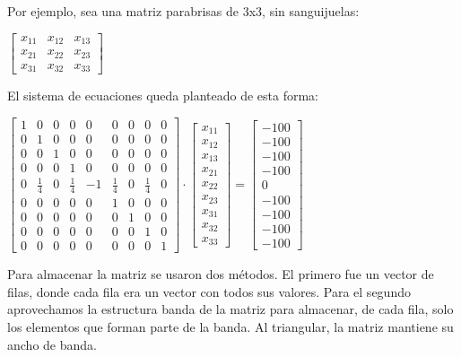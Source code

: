 \documentclass[spanish,a4paper]{article}
\begin{document}
Por ejemplo, sea una matriz parabrisas de 3x3, sin sanguijuelas: \newline \newline

$\begin{bmatrix}x_{11}&x_{12}&x_{13}\\x_{21}&x_{22}&x_{23}\\x_{31}&x_{32}&x_{33}\end{bmatrix}$ \newline \newline

El sistema de ecuaciones queda planteado de esta forma: \newline \newline

$\begin{bmatrix}1&0&0&0&0&0&0&0&0\\0&1&0&0&0&0&0&0&0\\0&0&1&0&0&0&0&0&0\\0&0&0&1&0&0&0&0&0\\0&\frac{1}{4}&0&\frac{1}{4}&-1&\frac{1}{4}&0&\frac{1}{4}&0\\0&0&0&0&0&1&0&0&0\\0&0&0&0&0&0&1&0&0\\0&0&0&0&0&0&0&1&0\\0&0&0&0&0&0&0&0&1\end{bmatrix} \cdot \begin{bmatrix}x_{11}\\x_{12}\\x_{13}\\x_{21}\\x_{22}\\x_{23}\\x_{31}\\x_{32}\\x_{33}\end{bmatrix} = \begin{bmatrix}-100\\-100\\-100\\-100\\0\\-100\\-100\\-100\\-100\end{bmatrix}$ \newline \newline

Para almacenar la matriz se usaron dos métodos. El primero fue un vector de filas, donde cada fila era un vector con todos sus valores. Para el segundo aprovechamos la estructura banda de la matriz para almacenar, de cada fila, solo los elementos que forman parte de la banda. Al triangular, la matriz mantiene su ancho de banda. 
\end{document}
